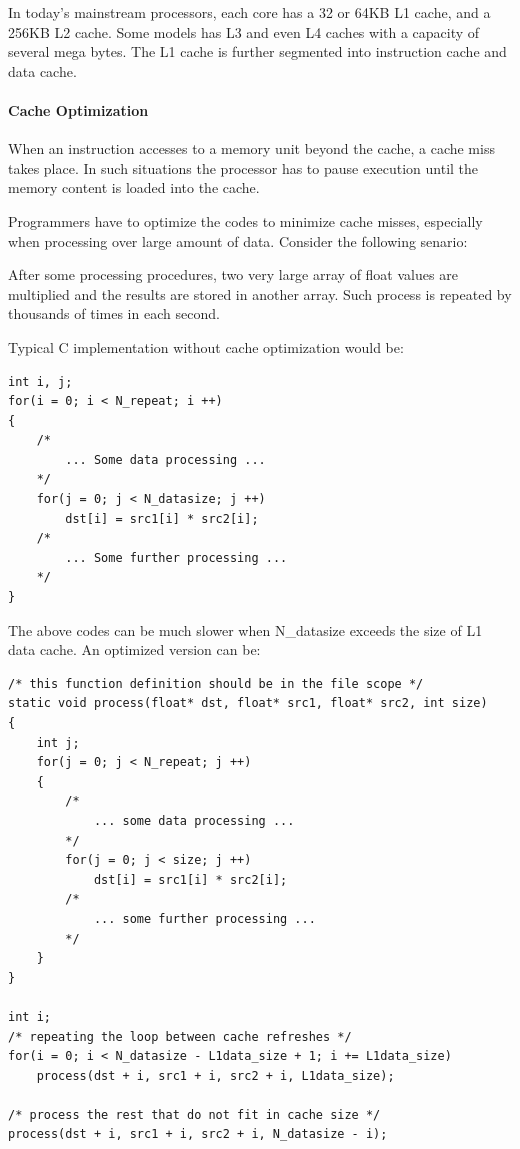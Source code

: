 \documentclass[a4paper]{report}
\begin{document}
	In today's mainstream processors, each core has a 32 or 64KB L1 cache, and a 256KB L2 cache. Some models has L3 and even L4 caches with a capacity of several mega bytes. The L1 cache is further segmented into instruction cache and data cache.

\paragraph{Cache Optimization} \indent \bigskip

	When an instruction accesses to a memory unit beyond the cache, a cache miss takes place. In such situations the processor has to pause execution until the memory content is loaded into the cache.
	
	Programmers have to optimize the codes to minimize cache misses, especially when processing over large amount of data. Consider the following senario:
	
	After some processing procedures, two very large array of float values are multiplied and the results are stored in another array. Such process is repeated by thousands of times in each second.
	
	Typical C implementation without cache optimization would be:

        \lstset{language = c, tabsize = 4}
        \begin{lstlisting}
int i, j;
for(i = 0; i < N_repeat; i ++)
{
	/*
		... Some data processing ...
	*/
	for(j = 0; j < N_datasize; j ++)
		dst[i] = src1[i] * src2[i];
	/*
		... Some further processing ...
	*/
}
        \end{lstlisting}

	The above codes can be much slower when N\_datasize exceeds the size of L1 data cache. An optimized version can be:

        \lstset{language = c, tabsize = 4}
        \begin{lstlisting}
/* this function definition should be in the file scope */
static void process(float* dst, float* src1, float* src2, int size)
{
	int j;
	for(j = 0; j < N_repeat; j ++)
	{
		/*
			... some data processing ...
		*/
		for(j = 0; j < size; j ++)
			dst[i] = src1[i] * src2[i];
		/*
			... some further processing ...
		*/
	}
}

int i;
/* repeating the loop between cache refreshes */
for(i = 0; i < N_datasize - L1data_size + 1; i += L1data_size)
	process(dst + i, src1 + i, src2 + i, L1data_size);

/* process the rest that do not fit in cache size */
process(dst + i, src1 + i, src2 + i, N_datasize - i);
        \end{lstlisting}
\end{document}
